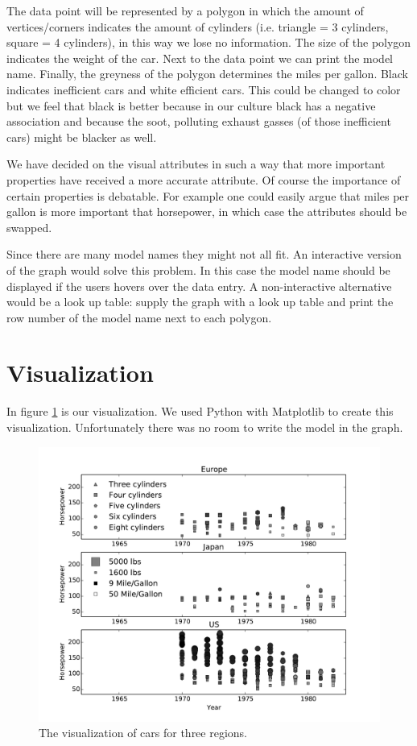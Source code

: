 \documentclass{article}[10pt]
\begin{document}
The data point will be represented by a polygon in which the amount of
vertices/corners indicates the amount of cylinders (i.e. triangle = 3 cylinders,
square = 4 cylinders), in this way we lose no information. The size of the
polygon indicates the weight of the car.
Next to the data point we can print the model name.
Finally, the greyness of the polygon determines the miles per gallon. Black
indicates inefficient cars and white efficient cars. This could be changed to
color but we feel that black is better because in our culture black has a
negative association and because the soot, polluting exhaust gasses
(of those inefficient cars) might be blacker as well.

We have decided on the visual attributes in such a way that more important
properties have received a more accurate attribute. Of course the importance of
certain properties is debatable. For example one could easily argue that
miles per gallon is more important that horsepower, in which case the attributes
should be swapped.

Since there are many model names they might not all fit. An interactive version
of the graph would solve this problem. In this case the model name should be
displayed if the users hovers over the data entry. A non-interactive
alternative would be a look up table: supply the graph with a look up table and
print the row number of the model name next to each polygon.

\section{Visualization}
In figure \ref{fig:vis} is our visualization. We used Python with Matplotlib to
create this visualization. Unfortunately there was no room to write the model
in the graph.

\begin{figure}[h!]
\includegraphics[width=\textwidth]{autovis}
\caption{The visualization of cars for three regions.}
\label{fig:vis}
\end{figure}
\end{document}
